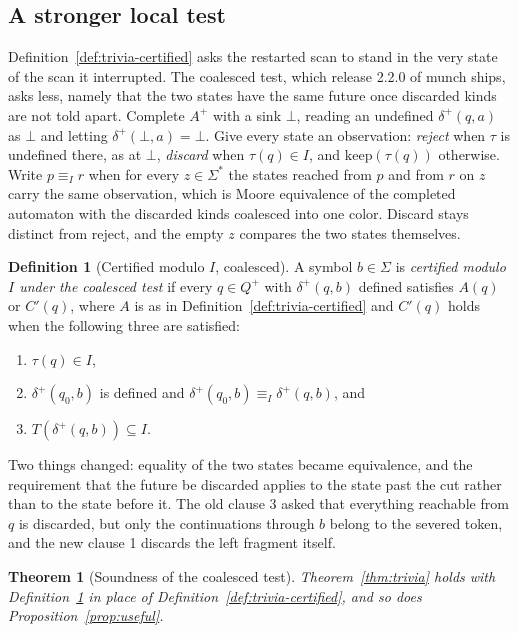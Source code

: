 \documentclass[11pt,a4paper]{article}
\theoremstyle{definition}
\newtheorem{definition}{Definition}
\theoremstyle{plain}
\newtheorem{theorem}{Theorem}
\begin{document}
\subsection{A stronger local test}
\label{sec:coalesced}

Definition~\ref{def:trivia-certified} asks the restarted scan to stand in the very state of the scan it interrupted. The
coalesced test, which release 2.2.0 of munch ships, asks less, namely that the two states have the same future once
discarded kinds are not told apart. Complete $A^+$ with a sink $\bot$, reading an undefined $\delta^+(q, a)$ as $\bot$
and letting $\delta^+(\bot, a) = \bot$. Give every state an observation: \emph{reject} when $\tau$ is undefined there,
as at $\bot$, \emph{discard} when $\tau(q) \in I$, and $\mathrm{keep}(\tau(q))$ otherwise. Write $p \equiv_I r$ when for
every $z \in \Sigma^*$ the states reached from $p$ and from $r$ on $z$ carry the same observation, which is Moore
equivalence of the completed automaton with the discarded kinds coalesced into one color. Discard stays distinct from
reject, and the empty $z$ compares the two states themselves.

\begin{definition}[Certified modulo $I$, coalesced]
\label{def:coalesced}
A symbol $b \in \Sigma$ is \emph{certified modulo $I$ under the coalesced test} if every $q \in Q^+$ with
$\delta^+(q, b)$ defined satisfies $A(q)$ or $C'(q)$, where $A$ is as in Definition~\ref{def:trivia-certified} and
$C'(q)$ holds when the following three are satisfied:
\begin{enumerate}
  \item $\tau(q) \in I$,
  \item $\delta^+(q_0, b)$ is defined and $\delta^+(q_0, b) \equiv_I \delta^+(q, b)$, and
  \item $T(\delta^+(q, b)) \subseteq I$.
\end{enumerate}
\end{definition}

Two things changed: equality of the two states became equivalence, and the requirement that the future be discarded
applies to the state past the cut rather than to the state before it. The old clause 3 asked that everything reachable
from $q$ is discarded, but only the continuations through $b$ belong to the severed token, and the new clause 1 discards
the left fragment itself.

\begin{theorem}[Soundness of the coalesced test]
\label{thm:coalesced}
Theorem~\ref{thm:trivia} holds with Definition~\ref{def:coalesced} in place of Definition~\ref{def:trivia-certified},
and so does Proposition~\ref{prop:useful}.
\end{theorem}
\end{document}

